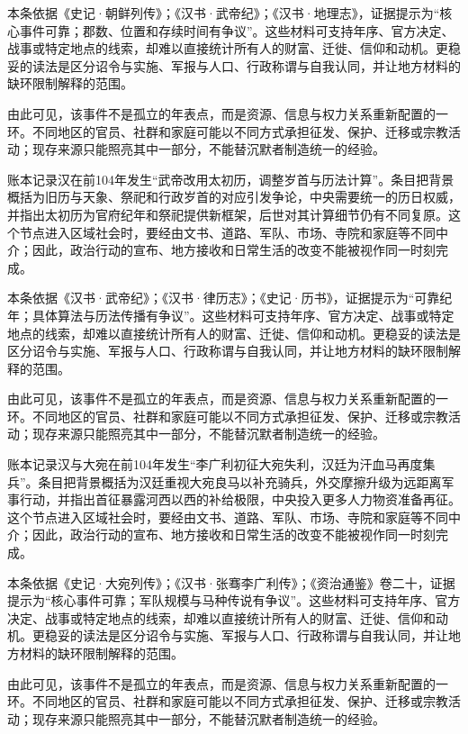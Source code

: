 本条依据《史记·朝鲜列传》；《汉书·武帝纪》；《汉书·地理志》，证据提示为“核心事件可靠；郡数、位置和存续时间有争议”。这些材料可支持年序、官方决定、战事或特定地点的线索，却难以直接统计所有人的财富、迁徙、信仰和动机。更稳妥的读法是区分诏令与实施、军报与人口、行政称谓与自我认同，并让地方材料的缺环限制解释的范围。

由此可见，该事件不是孤立的年表点，而是资源、信息与权力关系重新配置的一环。不同地区的官员、社群和家庭可能以不同方式承担征发、保护、迁移或宗教活动；现存来源只能照亮其中一部分，不能替沉默者制造统一的经验。

账本记录汉在前104年发生“武帝改用太初历，调整岁首与历法计算”。条目把背景概括为旧历与天象、祭祀和行政岁首的对应引发争论，中央需要统一的历日权威，并指出太初历为官府纪年和祭祀提供新框架，后世对其计算细节仍有不同复原。这个节点进入区域社会时，要经由文书、道路、军队、市场、寺院和家庭等不同中介；因此，政治行动的宣布、地方接收和日常生活的改变不能被视作同一时刻完成。

本条依据《汉书·武帝纪》；《汉书·律历志》；《史记·历书》，证据提示为“可靠纪年；具体算法与历法传播有争议”。这些材料可支持年序、官方决定、战事或特定地点的线索，却难以直接统计所有人的财富、迁徙、信仰和动机。更稳妥的读法是区分诏令与实施、军报与人口、行政称谓与自我认同，并让地方材料的缺环限制解释的范围。

由此可见，该事件不是孤立的年表点，而是资源、信息与权力关系重新配置的一环。不同地区的官员、社群和家庭可能以不同方式承担征发、保护、迁移或宗教活动；现存来源只能照亮其中一部分，不能替沉默者制造统一的经验。

账本记录汉与大宛在前104年发生“李广利初征大宛失利，汉廷为汗血马再度集兵”。条目把背景概括为汉廷重视大宛良马以补充骑兵，外交摩擦升级为远距离军事行动，并指出首征暴露河西以西的补给极限，中央投入更多人力物资准备再征。这个节点进入区域社会时，要经由文书、道路、军队、市场、寺院和家庭等不同中介；因此，政治行动的宣布、地方接收和日常生活的改变不能被视作同一时刻完成。

本条依据《史记·大宛列传》；《汉书·张骞李广利传》；《资治通鉴》卷二十，证据提示为“核心事件可靠；军队规模与马种传说有争议”。这些材料可支持年序、官方决定、战事或特定地点的线索，却难以直接统计所有人的财富、迁徙、信仰和动机。更稳妥的读法是区分诏令与实施、军报与人口、行政称谓与自我认同，并让地方材料的缺环限制解释的范围。

由此可见，该事件不是孤立的年表点，而是资源、信息与权力关系重新配置的一环。不同地区的官员、社群和家庭可能以不同方式承担征发、保护、迁移或宗教活动；现存来源只能照亮其中一部分，不能替沉默者制造统一的经验。

